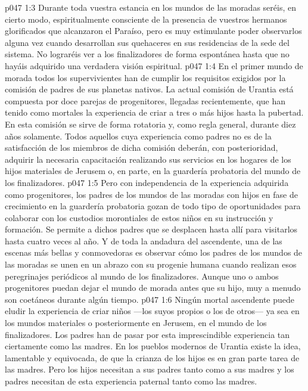 \vs p047 1:3 Durante toda vuestra estancia en los mundos de las moradas seréis, en cierto modo, espiritualmente consciente de la presencia de vuestros hermanos glorificados que alcanzaron el Paraíso, pero es muy estimulante poder observarlos alguna vez cuando desarrollan sus quehaceres en sus residencias de la sede del sistema. No lograréis ver a los finalizadores de forma espontánea hasta que no hayáis adquirido una verdadera visión espiritual.
\vs p047 1:4 \pc En el primer mundo de morada todos los supervivientes han de cumplir los requisitos exigidos por la comisión de padres de sus planetas nativos. La actual comisión de Urantia está compuesta por doce parejas de progenitores, llegadas recientemente, que han tenido como mortales la experiencia de criar a tres o más hijos hasta la pubertad. En esta comisión se sirve de forma rotatoria y, como regla general, durante diez años solamente. Todos aquellos cuya experiencia como padres no es de la satisfacción de los miembros de dicha comisión deberán, con posterioridad, adquirir la necesaria capacitación realizando sus servicios en los hogares de los hijos materiales de Jerusem o, en parte, en la guardería probatoria del mundo de los finalizadores.
\vs p047 1:5 Pero con independencia de la experiencia adquirida como progenitores, los padres de los mundos de las moradas con hijos en fase de crecimiento en la guardería probatoria gozan de todo tipo de oportunidades para colaborar con los custodios morontiales de estos niños en su instrucción y formación. Se permite a dichos padres que se desplacen hasta allí para visitarlos hasta cuatro veces al año. Y de toda la andadura del ascendente, una de las escenas más bellas y conmovedoras es observar cómo los padres de los mundos de las moradas se unen en un abrazo con su progenie humana cuando realizan esos peregrinajes periódicos al mundo de los finalizadores. Aunque uno o ambos progenitores puedan dejar el mundo de morada antes que su hijo, muy a menudo son coetáneos durante algún tiempo.
\vs p047 1:6 Ningún mortal ascendente puede eludir la experiencia de criar niños ---los suyos propios o los de otros--- ya sea en los mundos materiales o posteriormente en Jerusem, en el mundo de los finalizadores. Los padres han de pasar por esta imprescindible experiencia tan ciertamente como las madres. En los pueblos modernos de Urantia existe la idea, lamentable y equivocada, de que la crianza de los hijos es en gran parte tarea de las madres. Pero los hijos necesitan a sus padres tanto como a sus madres y los padres necesitan de esta experiencia paternal tanto como las madres.
